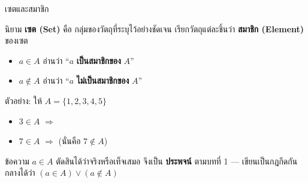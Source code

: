 \begin{frame}{เซตและสมาชิก}
  \begin{block}{นิยาม}
    \textbf{เซต (Set)} คือ กลุ่มของวัตถุที่ระบุไว้อย่างชัดเจน เรียกวัตถุแต่ละชิ้นว่า
    \textbf{สมาชิก (Element)} ของเซต
    \begin{itemize}
      \item $a \in A$ อ่านว่า ``$a$ \textbf{เป็นสมาชิกของ} $A$''
      \item $a \notin A$ อ่านว่า ``$a$ \textbf{ไม่เป็นสมาชิกของ} $A$''
    \end{itemize}
  \end{block}
  \vspace{0.3em}
  ตัวอย่าง: ให้ $A = \{1, 2, 3, 4, 5\}$
  \begin{itemize}
    \item $3 \in A$ \hfill $\Rightarrow$ \TT
    \item $7 \in A$ \hfill $\Rightarrow$ \FF \quad (นั่นคือ $7 \notin A$)
  \end{itemize}
  \vspace{0.3em}
  ข้อความ $a \in A$ ตัดสินได้ว่าจริงหรือเท็จเสมอ จึงเป็น \textbf{ประพจน์} ตามบทที่ 1
  --- เขียนเป็นกฎกีดกันกลางได้ว่า $(a \in A) \lor (a \notin A)$
\end{frame}

